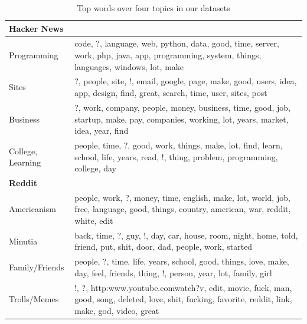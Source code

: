 \documentclass{article}
\begin{document}
\begin{table}[ht]\footnotesize
  \begin{tabularx}{0.5\textwidth}{| l X |}
   \hline
   \textbf{Hacker News} & \\
   \hline
   Programming  & code, ?, language, web, python, data, good, time, server, work, php, java, app, programming, system, things, languages, windows, lot, make \\

  Sites  & ?, people, site, !, email, google, page, make, good, users, idea, app, design, find, great, search, time, user, sites, post \\

  Business  & ?, work, company, people, money, business, time, good, job, startup, make, pay, companies, working, lot, years, market, idea, year, find \\

  College,  Learning  & people, time, ?, good, work, things, make, lot, find, learn, school, life, years, read, !, thing, problem, programming, college, day \\
   \hline
   \textbf{Reddit} & \\
   \hline
  Americanism & people, work, ?, money, time, english, make, lot, world, job, free, language, good, things, country, american, war, reddit, white, edit \\

  Minutia & back, time, ?, guy, !, day, car, house, room, night, home, told, friend, put, shit, door, dad, people, work, started \\

  Family/Friends  & people, ?, time, life, years, school, good, things, love, make, day, feel, friends, thing, !, person, year, lot, family, girl \\

  Trolls/Memes  & !, ?, http:\/\/www.youtube.com\/watch?v, edit, movie, fuck, man, good, song, deleted, love, shit, fucking, favorite, reddit, link, make, god, video, great \\
   \hline
  \end{tabularx}
  \caption{Top words over four topics in our datasets}
  \label{table:lda}
\end{table}
\end{document}
